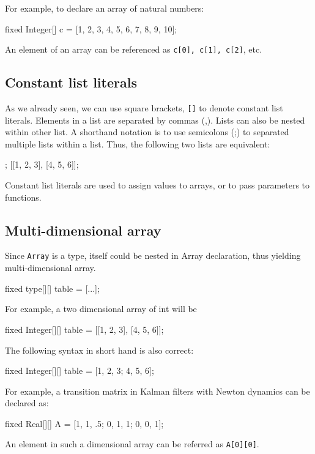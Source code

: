 \documentclass[12pt]{article}
\renewcommand{\optional}[1]{} %
\begin{document}
For example, to declare an array of natural numbers:
\begin{blogcode}
fixed Integer[] c = [1, 2, 3, 4, 5, 6, 7, 8, 9, 10];
\end{blogcode}

An element of an array can be referenced as \verb|c[0], c[1], c[2]|, etc.

\subsection{Constant list literals}
As we already seen, we can use square brackets, \texttt{[]} to denote constant list literals.
Elements in a list are separated by commas (,). Lists can also be nested within other list. A shorthand notation is to use semicolons (;) to separated multiple lists within a list.
Thus, the following two lists are equivalent:
\begin{blogcode}
[1, 2, 3; 4, 5, 6];
[[1, 2, 3], [4, 5, 6]];
\end{blogcode}

Constant list literals are used to assign values to arrays, or to pass parameters to functions.

\subsection{Multi-dimensional array}
Since \texttt{Array} is a type, itself could be nested in Array declaration, thus yielding multi-dimensional array. 
\begin{blogcode}
fixed type[][] table = [...];
\end{blogcode}

For example, a two dimensional array of int will be
\begin{blogcode}
fixed Integer[][] table = [[1, 2, 3], [4, 5, 6]];
\end{blogcode}
The following syntax in short hand is also correct:
\begin{blogcode}
fixed Integer[][] table = [1, 2, 3; 4, 5, 6];
\end{blogcode}


For example, a transition matrix in Kalman  filters with Newton dynamics can be declared as:
\begin{blogcode}
fixed Real[][] A = [1, 1, .5; 0, 1, 1; 0, 0, 1];
\end{blogcode}
An element in such a dimensional array can be referred as \texttt{A[0][0]}.

\optional{
\subsection{Size of an array}
There are two special functions to obtain the size of an array, \texttt{length(\mycdot)} and \texttt{size(\mycdot)}.
\texttt{length(\mycdot)} returns the length of one dimensional array, while \texttt{size(\mycdot)} returns the lengths of all dimensions
of a multidimensional array.  In the above example, \texttt{length(table)} equals 3, and \texttt{size(table)} equals \texttt{[2, 3]}.
}
\end{document}
